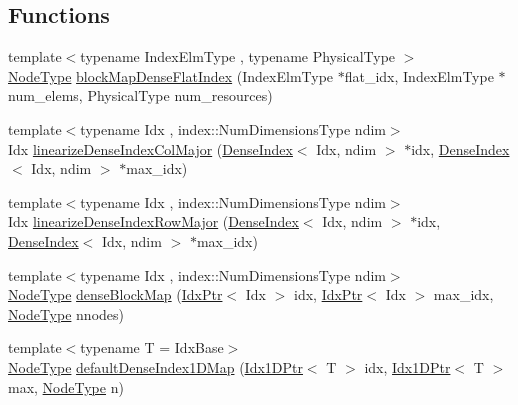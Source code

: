 \subsection*{Functions}
\begin{DoxyCompactItemize}
\item 
{\footnotesize template$<$typename Index\+Elm\+Type , typename Physical\+Type $>$ }\\\hyperlink{namespacevt_a866da9d0efc19c0a1ce79e9e492f47e2}{Node\+Type} \hyperlink{namespacevt_1_1mapping_abaff3ea69ef07a3762befc3628b8b577}{block\+Map\+Dense\+Flat\+Index} (Index\+Elm\+Type $\ast$flat\+\_\+idx, Index\+Elm\+Type $\ast$num\+\_\+elems, Physical\+Type num\+\_\+resources)
\item 
{\footnotesize template$<$typename Idx , index\+::\+Num\+Dimensions\+Type ndim$>$ }\\Idx \hyperlink{namespacevt_1_1mapping_a4dd58859e65edd3145fc52392161c90a}{linearize\+Dense\+Index\+Col\+Major} (\hyperlink{namespacevt_ac016d9c31465ce11c14eab2be11f9183}{Dense\+Index}$<$ Idx, ndim $>$ $\ast$idx, \hyperlink{namespacevt_ac016d9c31465ce11c14eab2be11f9183}{Dense\+Index}$<$ Idx, ndim $>$ $\ast$max\+\_\+idx)
\item 
{\footnotesize template$<$typename Idx , index\+::\+Num\+Dimensions\+Type ndim$>$ }\\Idx \hyperlink{namespacevt_1_1mapping_abcd5f8f5e5c974ef83eaa87eeeb416a6}{linearize\+Dense\+Index\+Row\+Major} (\hyperlink{namespacevt_ac016d9c31465ce11c14eab2be11f9183}{Dense\+Index}$<$ Idx, ndim $>$ $\ast$idx, \hyperlink{namespacevt_ac016d9c31465ce11c14eab2be11f9183}{Dense\+Index}$<$ Idx, ndim $>$ $\ast$max\+\_\+idx)
\item 
{\footnotesize template$<$typename Idx , index\+::\+Num\+Dimensions\+Type ndim$>$ }\\\hyperlink{namespacevt_a866da9d0efc19c0a1ce79e9e492f47e2}{Node\+Type} \hyperlink{namespacevt_1_1mapping_a290c8ece78ae8ffc8aa79dbb43a743d6}{dense\+Block\+Map} (\hyperlink{namespacevt_1_1mapping_a1bcab0d331bff853fe09c964d5e9cc8c}{Idx\+Ptr}$<$ Idx $>$ idx, \hyperlink{namespacevt_1_1mapping_a1bcab0d331bff853fe09c964d5e9cc8c}{Idx\+Ptr}$<$ Idx $>$ max\+\_\+idx, \hyperlink{namespacevt_a866da9d0efc19c0a1ce79e9e492f47e2}{Node\+Type} nnodes)
\item 
{\footnotesize template$<$typename T  = Idx\+Base$>$ }\\\hyperlink{namespacevt_a866da9d0efc19c0a1ce79e9e492f47e2}{Node\+Type} \hyperlink{namespacevt_1_1mapping_ae055a42b89a59fd6d0cc6d40f9abf3b5}{default\+Dense\+Index1\+D\+Map} (\hyperlink{namespacevt_1_1mapping_a8b576cf2f31069778e4951f64bccafd8}{Idx1\+D\+Ptr}$<$ T $>$ idx, \hyperlink{namespacevt_1_1mapping_a8b576cf2f31069778e4951f64bccafd8}{Idx1\+D\+Ptr}$<$ T $>$ max, \hyperlink{namespacevt_a866da9d0efc19c0a1ce79e9e492f47e2}{Node\+Type} n)

\end{DoxyCompactItemize}
